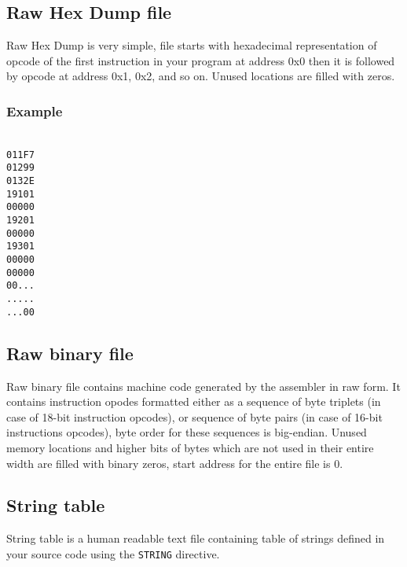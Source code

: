    \clearpage
    \subsection{Raw Hex Dump file}
        Raw Hex Dump is very simple, file starts with hexadecimal representation of opcode of the first instruction in your program at address 0x0 then it is followed by opcode at address 0x1, 0x2, and so on. Unused locations are filled with zeros.

        \subsubsection{Example}
            ~\\
            \verb'011F7'\\
            \verb'01299'\\
            \verb'0132E'\\
            \verb'19101'\\
            \verb'00000'\\
            \verb'19201'\\
            \verb'00000'\\
            \verb'19301'\\
            \verb'00000'\\
            \verb'00000'\\
            \verb'00...'\\
            \verb'.....'\\
            \verb'...00'

    \subsection{Raw binary file}
        Raw binary file contains machine code generated by the assembler in raw form. It contains instruction opodes formatted either as a sequence of byte triplets (in case of 18-bit instruction opcodes), or sequence of byte pairs (in case of 16-bit instructions opcodes), byte order for these sequences is big-endian. Unused memory locations and higher bits of bytes which are not used in their entire width are filled with binary zeros, start address for the entire file is 0.

    \subsection{String table}
        String table is a human readable text file containing table of strings defined in your source code using the \texttt{STRING} directive.

